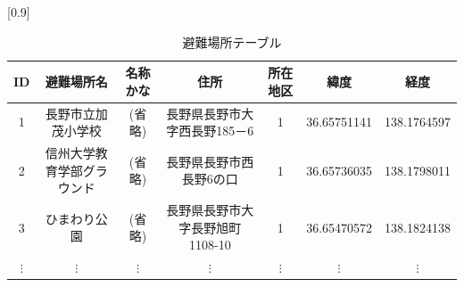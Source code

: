 \documentclass[a4j]{jarticle}
\begin{document}
          \begin{table}[H]
            \caption{避難場所テーブル}
            \label{four31}
            \begin{center}
              \scalebox{0.7}[0.9]{
                \begin{tabular}{c|c|c|c|c|c|c}\hline
                  ID & 避難場所名 & 名称かな & 住所 & 所在地区 & 緯度 & 経度 \\ \hline \hline
                  1 & 長野市立加茂小学校 & (省略) & 長野県長野市大字西長野185－6 & 1 & 36.65751141 & 138.1764597 \\ \hline
                  2 & 信州大学教育学部グラウンド & (省略) & 長野県長野市西長野6の口 & 1 & 36.65736035 & 138.1798011 \\ \hline
                  3 & ひまわり公園 & (省略) & 長野県長野市大字長野旭町1108-10 & 1 & 36.65470572 & 138.1824138 \\ \hline
                  $\vdots$ & $\vdots$ & $\vdots$ & $\vdots$ & $\vdots$ & $\vdots$ & $\vdots$\\ \hline
                \end{tabular}
              }
            \end{center}
            \end{table}
\end{document}
